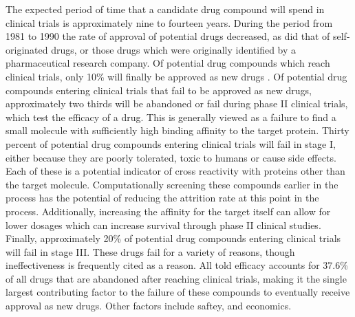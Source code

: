 The expected period of time that a candidate drug compound will spend in clinical trials is approximately nine to fourteen years\cite{dimasi2003price,paul2010improve}.
During the period from 1981 to 1990 the rate of approval of potential drugs decreased, as did that of self-originated drugs, or those drugs which were originally identified by a pharmaceutical research company.
Of potential drug compounds which reach clinical trials, only 10\% will finally be approved as new drugs \cite{dimasi2001risks,paul2010improve}.
Of potential drug compounds entering clinical trials that fail to be approved as new drugs, approximately two thirds will be abandoned or fail during phase II clinical trials, which test the efficacy of a drug.
This is generally viewed as a failure to find a small molecule with sufficiently high binding affinity to the target protein.
Thirty percent of potential drug compounds entering clinical trials will fail in stage I, either because they are poorly tolerated, toxic to humans or cause side effects.
Each of these is a potential indicator of cross reactivity with proteins other than the target molecule.
Computationally screening these compounds earlier in the process has the potential of reducing the attrition rate at this point in the process.
Additionally, increasing the affinity for the target itself can allow for lower dosages which can increase survival through phase II clinical studies.
Finally, approximately 20\% of potential drug compounds entering clinical trials will fail in stage III.
These drugs fail for a variety of reasons, though ineffectiveness is frequently cited as a reason.
All told efficacy accounts for 37.6\% of all drugs that are abandoned after reaching clinical trials, making it the single largest contributing factor to the failure of these compounds to eventually receive approval as new drugs.
Other factors include saftey, and economics.
\cite{dimasi2001risks}

